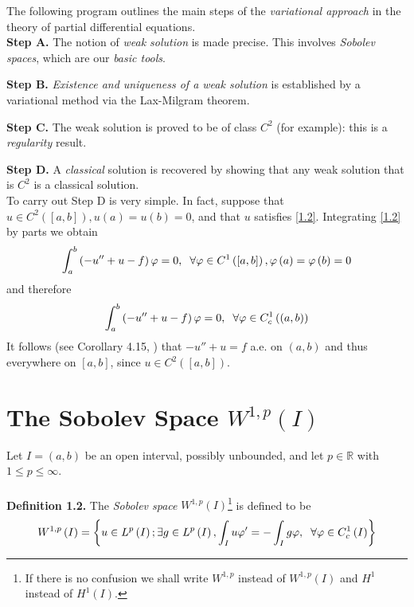 \documentclass[a4paper,oneside]{article}
\numberwithin{equation}{section}
\begin{document}
The following program outlines the main steps of the \textit{variational approach} in the theory of partial differential equations.\\

\textbf{Step A.} The notion of \textit{weak solution} is made precise. This involves \textit{Sobolev spaces}, which are our \textit{basic tools}.

\textbf{Step B.} \textit{Existence and uniqueness of a weak solution} is established by a variational method via the Lax-Milgram theorem.

\textbf{Step C.} The weak solution is proved to be of class $C^2$ (for example): this is a \textit{regularity} result.

\textbf{Step D.} A \textit{classical} solution is recovered by showing that any weak solution that is $C^2$ is a classical solution.\\

To carry out Step D is very simple. In fact, suppose that $u \in {C^2}\left( {\left[ {a,b} \right]} \right),u\left( a \right) = u\left( b \right) = 0$, and that $u$ satisfies \eqref{1.2}. Integrating \eqref{1.2} by parts we obtain
\begin{align}
\int_a^b {\left( { - u'' + u - f} \right)\varphi }  = 0,\hspace{0.2cm}\forall \varphi  \in {C^1}\left( {\left[ {a,b} \right]} \right),\varphi \left( a \right) = \varphi \left( b \right) = 0
\end{align}
and therefore
\begin{align}
\int_a^b {\left( { - u'' + u - f} \right)\varphi }  = 0,\hspace{0.2cm}\forall \varphi  \in C_c^1\left( {\left( {a,b} \right)} \right)
\end{align}
It follows (see Corollary 4.15, \cite{1}) that $-u''+u=f$  a.e. on $\left(a,b\right)$ and thus everywhere on $\left[a,b\right]$, since $u \in {C^2}\left( {\left[ {a,b} \right]} \right)$.
\section{The Sobolev Space $W^{1,p}\left(I\right)$}
Let $I=\left(a,b\right)$ be an open interval, possibly unbounded, and let $p \in \mathbb{R}$ with $1\le p \le \infty$.\\
\\
\textbf{Definition 1.2.} The \textit{Sobolev space} $W^{1,p}\left(I\right)$\footnote{If there is no confusion we shall write $W^{1,p}$ instead of $W^{1,p}\left(I\right)$ and $H^1$ instead of $H^1\left(I\right)$.} is defined to be
\begin{align}
\label{1.5}
{W^{1,p}}\left( I \right) = \left\{ {u \in {L^p}\left( I \right);\exists g \in {L^p}\left( I \right),\int_I {u\varphi '}  =  - \int_I {g\varphi } ,\hspace{0.2cm}\forall \varphi  \in C_c^1\left( I \right)} \right\}
\end{align}
\end{document}
